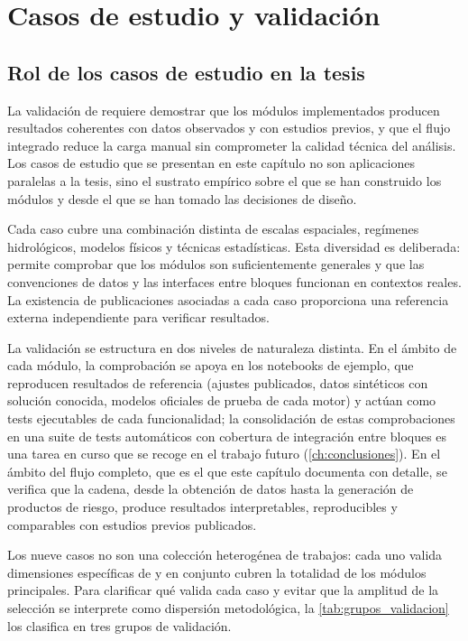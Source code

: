 \chapter{Casos de estudio y validación}
\label{ch:casos_estudio}

\section{Rol de los casos de estudio en la tesis}

La validación de \hydra requiere demostrar que los módulos implementados producen resultados coherentes con datos observados y con estudios previos, y que el flujo integrado reduce la carga manual sin comprometer la calidad técnica del análisis. Los casos de estudio que se presentan en este capítulo no son aplicaciones paralelas a la tesis, sino el sustrato empírico sobre el que se han construido los módulos y desde el que se han tomado las decisiones de diseño.

Cada caso cubre una combinación distinta de escalas espaciales, regímenes hidrológicos, modelos físicos y técnicas estadísticas. Esta diversidad es deliberada: permite comprobar que los módulos son suficientemente generales y que las convenciones de datos y las interfaces entre bloques funcionan en contextos reales. La existencia de publicaciones asociadas a cada caso proporciona una referencia externa independiente para verificar resultados.

La validación se estructura en dos niveles de naturaleza distinta. En el ámbito de cada módulo, la comprobación se apoya en los notebooks de ejemplo, que reproducen resultados de referencia (ajustes publicados, datos sintéticos con solución conocida, modelos oficiales de prueba de cada motor) y actúan como tests ejecutables de cada funcionalidad; la consolidación de estas comprobaciones en una suite de tests automáticos con cobertura de integración entre bloques es una tarea en curso que se recoge en el trabajo futuro (\cref{ch:conclusiones}). En el ámbito del flujo completo, que es el que este capítulo documenta con detalle, se verifica que la cadena, desde la obtención de datos hasta la generación de productos de riesgo, produce resultados interpretables, reproducibles y comparables con estudios previos publicados.

Los nueve casos no son una colección heterogénea de trabajos: cada uno valida dimensiones específicas de \hydra y en conjunto cubren la totalidad de los módulos principales. Para clarificar qué valida cada caso y evitar que la amplitud de la selección se interprete como dispersión metodológica, la \cref{tab:grupos_validacion} los clasifica en tres grupos de validación.

